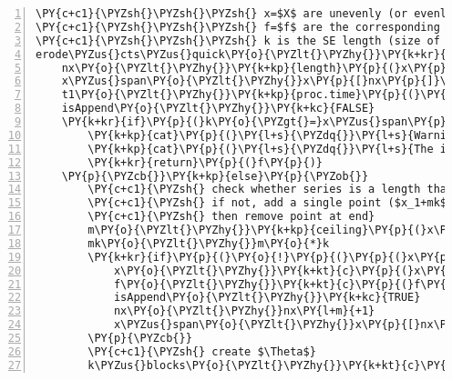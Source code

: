 \begin{Verbatim}[commandchars=\\\{\},codes={\catcode`\$=3\catcode`\^=7\catcode`\_=8},gobble=0,numbers=left,fontfamily=fvm,fontshape=n,fontsize=\footnotesize,tabsize=2]
\PY{c+c1}{\PYZsh{}\PYZsh{}\PYZsh{} x=$X$ are unevenly (or evenly) spaced locations of the intensities}
\PY{c+c1}{\PYZsh{}\PYZsh{}\PYZsh{} f=$f$ are the corresponding intensity values}
\PY{c+c1}{\PYZsh{}\PYZsh{}\PYZsh{} k is the SE length (size of $B$)}
erode\PYZus{}cts\PYZus{}quick\PY{o}{\PYZlt{}\PYZhy{}}\PY{k+kr}{function}\PY{p}{(}x\PY{p}{,}f\PY{p}{,}k\PY{p}{)}\PY{p}{\PYZob{}}
	nx\PY{o}{\PYZlt{}\PYZhy{}}\PY{k+kp}{length}\PY{p}{(}x\PY{p}{)}
	x\PYZus{}span\PY{o}{\PYZlt{}\PYZhy{}}x\PY{p}{[}nx\PY{p}{]}\PY{o}{\PYZhy{}}x\PY{p}{[}\PY{l+m}{1}\PY{p}{]}
	t1\PY{o}{\PYZlt{}\PYZhy{}}\PY{k+kp}{proc.time}\PY{p}{(}\PY{p}{)}\PY{p}{[}\PY{l+m}{3}\PY{p}{]}
	isAppend\PY{o}{\PYZlt{}\PYZhy{}}\PY{k+kc}{FALSE}
	\PY{k+kr}{if}\PY{p}{(}k\PY{o}{\PYZgt{}=}x\PYZus{}span\PY{p}{)}\PY{p}{\PYZob{}}
		\PY{k+kp}{cat}\PY{p}{(}\PY{l+s}{\PYZdq{}}\PY{l+s}{Warning: structuring element spans the entire input set \PYZbs{}n\PYZdq{}}\PY{p}{)}
		\PY{k+kp}{cat}\PY{p}{(}\PY{l+s}{\PYZdq{}}\PY{l+s}{The input f vector has been output \PYZbs{}n\PYZdq{}}\PY{p}{)}
		\PY{k+kr}{return}\PY{p}{(}f\PY{p}{)}
	\PY{p}{\PYZcb{}}\PY{k+kp}{else}\PY{p}{\PYZob{}}
		\PY{c+c1}{\PYZsh{} check whether series is a length that is a multiple of k}
		\PY{c+c1}{\PYZsh{} if not, add a single point ($x_1+mk$,$\infty$) to series for algorithm,}
		\PY{c+c1}{\PYZsh{} then remove point at end}
		m\PY{o}{\PYZlt{}\PYZhy{}}\PY{k+kp}{ceiling}\PY{p}{(}x\PYZus{}span\PY{o}{/}k\PY{p}{)}
		mk\PY{o}{\PYZlt{}\PYZhy{}}m\PY{o}{*}k
		\PY{k+kr}{if}\PY{p}{(}\PY{o}{!}\PY{p}{(}\PY{p}{(}x\PY{p}{[}\PY{l+m}{1}\PY{p}{]}\PY{o}{+}mk\PY{p}{)} \PY{o}{==} x\PY{p}{[}nx\PY{p}{]}\PY{p}{)}\PY{p}{)}\PY{p}{\PYZob{}}
			x\PY{o}{\PYZlt{}\PYZhy{}}\PY{k+kt}{c}\PY{p}{(}x\PY{p}{,}x\PY{p}{[}\PY{l+m}{1}\PY{p}{]}\PY{o}{+}mk\PY{p}{)}
			f\PY{o}{\PYZlt{}\PYZhy{}}\PY{k+kt}{c}\PY{p}{(}f\PY{p}{,}\PY{o}{+}\PY{k+kc}{Inf}\PY{p}{)}
			isAppend\PY{o}{\PYZlt{}\PYZhy{}}\PY{k+kc}{TRUE}
			nx\PY{o}{\PYZlt{}\PYZhy{}}nx\PY{l+m}{+1}
			x\PYZus{}span\PY{o}{\PYZlt{}\PYZhy{}}x\PY{p}{[}nx\PY{p}{]}\PY{o}{\PYZhy{}}x\PY{p}{[}\PY{l+m}{1}\PY{p}{]}
		\PY{p}{\PYZcb{}}
		\PY{c+c1}{\PYZsh{} create $\Theta$}
		k\PYZus{}blocks\PY{o}{\PYZlt{}\PYZhy{}}\PY{k+kt}{c}\PY{p}{(}\PY{l+m}{0}\PY{p}{,}\PY{k+kp}{findInterval}\PY{p}{(}x\PY{p}{,}\PY{k+kp}{seq}\PY{p}{(}x\PY{p}{[}\PY{l+m}{1}\PY{p}{]}\PY{p}{,}x\PY{p}{[}\PY{l+m}{1}\PY{p}{]}\PY{o}{+}\PY{p}{(}m\PY{l+m}{\PYZhy{}1}\PY{p}{)}\PY{o}{*}k\PY{p}{,}by\PY{o}{=}k\PY{p}{)}\PY{p}{)}\PY{p}{,}m\PY{l+m}{+1}\PY{p}{)}

\end{Verbatim}

